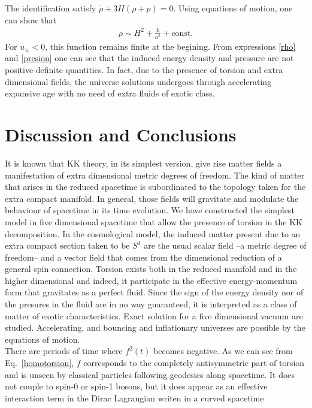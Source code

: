 \documentclass[aps,prd,12pt,superscriptaddress,showpacs,showkeys,longbibliography,reprint]{revtex4-1}
\begin{document}
The identification satisfy $\dot{\rho}+3H\left(\rho+p\right)=0$. Using equations of motion, one can show that
\begin{align*}
\rho\sim H^2+\frac{k}{a^2}+\text{const.}
\end{align*}
For $u_\pm<0$, this function remains finite at the begining.
From expressions \eqref{rho} and \eqref{presion} one can see that the induced energy density and pressure are not positive definite quantities. In fact, due to the presence of torsion and extra dimensional fields, the universe solutions undergoes through accelerating expansive age with no need of extra fluids of exotic class. 


\section{Discussion and Conclusions}\label{conclusions}
It is known that KK theory, in its simplest version, give rise matter fields a manifestation of extra dimensional metric degrees of freedom. The kind of matter that arises in the reduced spacetime is subordinated to the topology taken for the extra compact manifold. In general, those fields will gravitate and modulate the behaviour of spacetime in its time evolution. We have constructed the simplest model in five dimensional spacetime that allow the presence of torsion in the KK decomposition. In the cosmological model, the induced matter present due to an extra compact section taken to be $S^1$ are the usual scalar field --a metric degree of freedom-- and a vector field that comes from the dimensional reduction of a general spin connection. Torsion exists both in the reduced manifold and in the higher dimensional and indeed, it participate in the effective energy-momentum form that gravitates as a perfect fluid. Since the sign of the energy density nor of the presures in the fluid are in no way guaranteed, it is interpreted as a class of matter of exotic characteristics. Exact solution for a five dimensional vacuum are studied. Accelerating, and bouncing and inflationary universes are possible by the equations of motion.\\
There are periods of time where $f^2(t)$ becomes negative. As we can see from Eq.~\eqref{homotorsion}, $f$ corresponds to the completely antisymmetric part of torsion and is unseen by classical particles following geodesics along spacetime. It does not couple to spin-0 or spin-1 bosons, but it does appear as an effective interaction term in the Dirac Lagrangian writen in a curved spacetime \cite{Carroll:1994dq}
\end{document}
